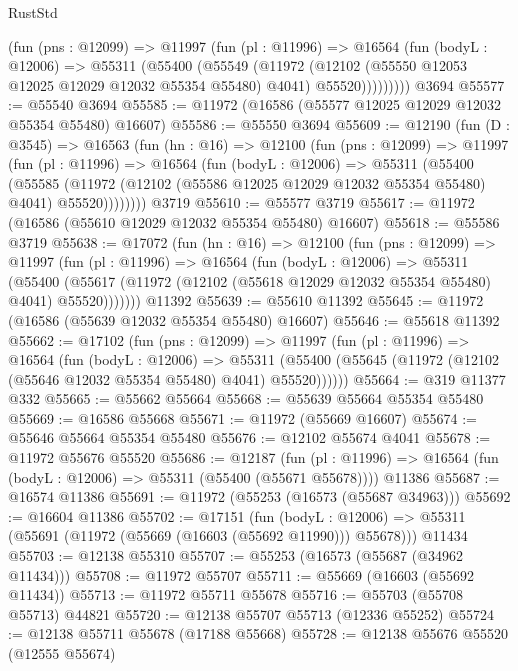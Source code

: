 \begin{lexlean}{RustStd}
\begin{coremodule}
          (fun (pns : @12099) =>
          @11997
            (fun (pl : @11996) =>
            @16564
              (fun (bodyL : @12006) =>
              @55311
                (@55400
                  (@55549
                    (@11972
                      (@12102 (@55550 @12053 @12025 @12029 @12032 @55354 @55480) @4041)
                      @55520)))))))))
    @3694
@55577 := @55540 @3694
@55585 := @11972 (@16586 (@55577 @12025 @12029 @12032 @55354 @55480) @16607)
@55586 := @55550 @3694
@55609 := @12190
    (fun (D : @3545) =>
    @16563
      (fun (hn : @16) =>
      @12100
        (fun (pns : @12099) =>
        @11997
          (fun (pl : @11996) =>
          @16564
            (fun (bodyL : @12006) =>
            @55311
              (@55400
                (@55585
                  (@11972 (@12102 (@55586 @12025 @12029 @12032 @55354 @55480) @4041) @55520))))))))
    @3719
@55610 := @55577 @3719
@55617 := @11972 (@16586 (@55610 @12029 @12032 @55354 @55480) @16607)
@55618 := @55586 @3719
@55638 := @17072
    (fun (hn : @16) =>
    @12100
      (fun (pns : @12099) =>
      @11997
        (fun (pl : @11996) =>
        @16564
          (fun (bodyL : @12006) =>
          @55311
            (@55400
              (@55617 (@11972 (@12102 (@55618 @12029 @12032 @55354 @55480) @4041) @55520)))))))
    @11392
@55639 := @55610 @11392
@55645 := @11972 (@16586 (@55639 @12032 @55354 @55480) @16607)
@55646 := @55618 @11392
@55662 := @17102
    (fun (pns : @12099) =>
    @11997
      (fun (pl : @11996) =>
      @16564
        (fun (bodyL : @12006) =>
        @55311 (@55400 (@55645 (@11972 (@12102 (@55646 @12032 @55354 @55480) @4041) @55520))))))
@55664 := @319 @11377 @332
@55665 := @55662 @55664
@55668 := @55639 @55664 @55354 @55480
@55669 := @16586 @55668
@55671 := @11972 (@55669 @16607)
@55674 := @55646 @55664 @55354 @55480
@55676 := @12102 @55674 @4041
@55678 := @11972 @55676 @55520
@55686 := @12187
    (fun (pl : @11996) => @16564 (fun (bodyL : @12006) => @55311 (@55400 (@55671 @55678))))
    @11386
@55687 := @16574 @11386
@55691 := @11972 (@55253 (@16573 (@55687 @34963)))
@55692 := @16604 @11386
@55702 := @17151
    (fun (bodyL : @12006) => @55311 (@55691 (@11972 (@55669 (@16603 (@55692 @11990))) @55678)))
    @11434
@55703 := @12138 @55310
@55707 := @55253 (@16573 (@55687 (@34962 @11434)))
@55708 := @11972 @55707
@55711 := @55669 (@16603 (@55692 @11434))
@55713 := @11972 @55711 @55678
@55716 := @55703 (@55708 @55713) @44821
@55720 := @12138 @55707 @55713 (@12336 @55252)
@55724 := @12138 @55711 @55678 (@17188 @55668)
@55728 := @12138 @55676 @55520 (@12555 @55674)

\end{coremodule}
\end{lexlean}
